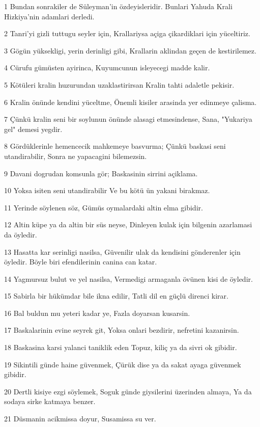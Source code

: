 \par 1 Bundan sonrakiler de Süleyman'in özdeyisleridir. Bunlari Yahuda Krali Hizkiya'nin adamlari derledi.
\par 2 Tanri'yi gizli tuttugu seyler için, Krallariysa açiga çikardiklari için yüceltiriz.
\par 3 Gögün yüksekligi, yerin derinligi gibi, Krallarin aklindan geçen de kestirilemez.
\par 4 Cürufu gümüsten ayirinca, Kuyumcunun isleyecegi madde kalir.
\par 5 Kötüleri kralin huzurundan uzaklastirirsan Kralin tahti adaletle pekisir.
\par 6 Kralin önünde kendini yüceltme, Önemli kisiler arasinda yer edinmeye çalisma.
\par 7 Çünkü kralin seni bir soylunun önünde alasagi etmesindense, Sana, "Yukariya gel" demesi yegdir.
\par 8 Gördüklerinle hemencecik mahkemeye basvurma; Çünkü baskasi seni utandirabilir, Sonra ne yapacagini bilemezsin.
\par 9 Davani dogrudan komsunla gör; Baskasinin sirrini açiklama.
\par 10 Yoksa isiten seni utandirabilir Ve bu kötü ün yakani birakmaz.
\par 11 Yerinde söylenen söz, Gümüs oymalardaki altin elma gibidir.
\par 12 Altin küpe ya da altin bir süs neyse, Dinleyen kulak için bilgenin azarlamasi da öyledir.
\par 13 Hasatta kar serinligi nasilsa, Güvenilir ulak da kendisini gönderenler için öyledir. Böyle biri efendilerinin canina can katar.
\par 14 Yagmursuz bulut ve yel nasilsa, Vermedigi armaganla övünen kisi de öyledir.
\par 15 Sabirla bir hükümdar bile ikna edilir, Tatli dil en güçlü direnci kirar.
\par 16 Bal buldun mu yeteri kadar ye, Fazla doyarsan kusarsin.
\par 17 Baskalarinin evine seyrek git, Yoksa onlari bezdirir, nefretini kazanirsin.
\par 18 Baskasina karsi yalanci taniklik eden Topuz, kiliç ya da sivri ok gibidir.
\par 19 Sikintili günde haine güvenmek, Çürük dise ya da sakat ayaga güvenmek gibidir.
\par 20 Dertli kisiye ezgi söylemek, Soguk günde giysilerini üzerinden almaya, Ya da sodaya sirke katmaya benzer.
\par 21 Düsmanin acikmissa doyur, Susamissa su ver.
